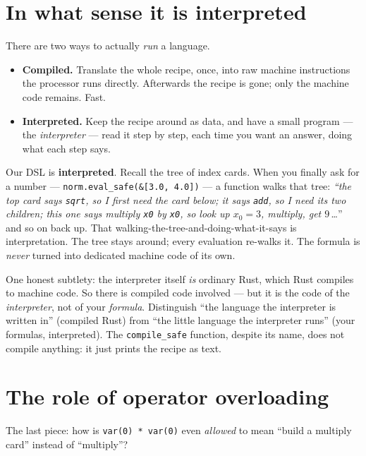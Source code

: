 \documentclass[11pt]{article}
\newcommand{\code}[1]{\texttt{#1}}
\begin{document}
\section{In what sense it is interpreted}

There are two ways to actually \emph{run} a language.

\begin{itemize}[leftmargin=1.4em]
  \item \textbf{Compiled.} Translate the whole recipe, once, into raw machine
  instructions the processor runs directly. Afterwards the recipe is gone; only
  the machine code remains. Fast.
  \item \textbf{Interpreted.} Keep the recipe around as data, and have a small
  program --- the \emph{interpreter} --- read it step by step, each time you want
  an answer, doing what each step says.
\end{itemize}

Our DSL is \textbf{interpreted}. Recall the tree of index cards. When you finally
ask for a number --- \code{norm.eval\_safe(\&[3.0, 4.0])} --- a function walks
that tree: \emph{``the top card says \code{sqrt}, so I first need the card below;
it says \code{add}, so I need its two children; this one says multiply
\code{x0} by \code{x0}, so look up $x_0 = 3$, multiply, get $9$}\,\ldots'' and so
on back up. That walking-the-tree-and-doing-what-it-says is interpretation. The
tree stays around; every evaluation re-walks it. The formula is \emph{never}
turned into dedicated machine code of its own.

\begin{keyidea}
One honest subtlety: the interpreter itself \emph{is} ordinary Rust, which Rust
compiles to machine code. So there is compiled code involved --- but it is the
code of the \emph{interpreter}, not of your \emph{formula}. Distinguish ``the
language the interpreter is written in'' (compiled Rust) from ``the little
language the interpreter runs'' (your formulas, interpreted). The
\code{compile\_safe} function, despite its name, does not compile anything: it
just prints the recipe as text.
\end{keyidea}

\section{The role of operator overloading}

The last piece: how is \code{var(0) * var(0)} even \emph{allowed} to mean ``build
a multiply card'' instead of ``multiply''?
\end{document}
